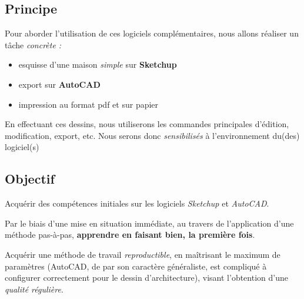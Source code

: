 \documentclass[a4paper,12pt,french]{sphinxmanual}
\begin{document}
\subsection{Principe}
\label{init_su+acad/intro:principe}
Pour aborder l'utilisation de ces logiciels complémentaires, nous allons
réaliser un tâche \emph{concrète :}
\begin{itemize}
\item {} 
esquisse d'une maison \emph{simple} sur \textbf{Sketchup}

\item {} 
export sur \textbf{AutoCAD}

\item {} 
impression au format pdf et sur papier

\end{itemize}

En effectuant ces dessins, nous utiliserons les commandes principales
d'édition, modification, export, etc. Nous serons donc \emph{sensibilisés} à
l'environnement du(des) logiciel(s)


\subsection{Objectif}
\label{init_su+acad/intro:objectif}
Acquérir des compétences initiales sur les logiciels  \emph{Sketchup} et \emph{AutoCAD}.

Par le biais d'une mise en situation immédiate, au travers de l'application d'une méthode pas-à-pas, \textbf{apprendre en faisant bien, la première fois}.

Acquérir une méthode de travail \emph{reproductible}, en maîtrisant le maximum de paramètres (AutoCAD, de par son caractère généraliste, est compliqué à configurer correctement pour le dessin d'architecture), visant l'obtention d'une \emph{qualité régulière}.
\end{document}
